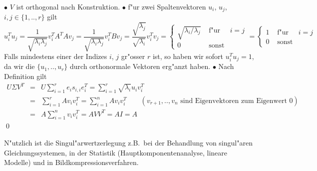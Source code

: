 $\bullet$ $V$ ist orthogonal nach Konstruktion.
$\bullet$ f"ur zwei Spaltenvektoren $u_i$, $u_j$, $i,j\in\{1,..,r\}$ gilt
$$ u_i^T u_j 
= \frac 1 {\sqrt{\lambda_i\lambda_j}} v_i^T A^T A v_j 
= \frac 1 {\sqrt{\lambda_i\lambda_j}} v_i^T B v_j 
= \frac{\sqrt{\lambda_j}}{\sqrt{\lambda_i}} v_i^T v_j 
= 
\left\{\begin{array}{ccc}
\sqrt{\lambda_i/\lambda_j}&\mbox{ f"ur }&i=j\\
0 &\mbox{ sonst}&\
\end{array}\right.
= 
\left\{\begin{array}{ccc}
1&\mbox{ f"ur }&i=j\\
0 &\mbox{ sonst}&\
\end{array}\right.
$$
Falls mindestens einer der Indizes $i$, $j$ gr"osser $r$ ist, so haben wir 
sofort $u_i^T u_j=1$, da wir die $\{u_1,..,u_r\}$ durch orthonormale 
Vektoren erg"anzt haben.
$\bullet$ Nach Definition gilt
\begin{eqnarray*}
U\Sigma V^T & = & U \sum_{i=1}^r e_i s_{i,i} e_i^T = \sum_{i=1}^r \sqrt{\lambda_i} u_i v_i^T \\
& = &  \sum_{i=1}^r  A v_i v_i^T 
 =   \sum_{i=1}^n  A v_i v_i^T \qquad ( v_{r+1},.., v_n \mbox{ sind Eigenvektoren zum Eigenwert }0)\\
& = & A  \sum_{i=1}^n  v_i v_i^T 
 =  A  V V^T  = A I = A
\end{eqnarray*}
\qed 

N"utzlich ist die Singul"arwertzerlegung z.B.\ bei der Behandlung von singul"aren 
Gleichungssystemen, in der Statistik (Hauptkomponentenanalyse, lineare Modelle) 
und in Bildkompressionsverfahren.

